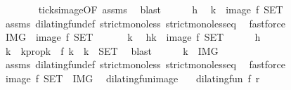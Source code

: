 \begin{isabellebody}
\ \ \ \ \ \ \isamarkupfalse%
\ ticks{\isacharunderscore}image{\isacharbrackleft}OF\ assms{\isacharbrackright}\ \isamarkupfalse%
\ blast\isanewline
\ \ \ \ \isamarkupfalse%
\ h\ \isamarkupfalse%
\ {\isacartoucheopen}k\ {\isasymin}\ image\ f\ {\isacharquery}SET{\isacartoucheclose}\isanewline
\ \ \ \ \ \ \isamarkupfalse%
\ assms\ dilating{\isacharunderscore}fun{\isacharunderscore}def\ strict{\isacharunderscore}mono{\isacharunderscore}less\ strict{\isacharunderscore}mono{\isacharunderscore}less{\isacharunderscore}eq\ \isamarkupfalse%
\ fastforce\isanewline
\ \ \isacommand{{\isacharbraceright}}\isamarkupfalse%
\ \isamarkupfalse%
\ {\isacartoucheopen}{\isacharquery}IMG\ {\isasymsubseteq}\ image\ f\ {\isacharquery}SET{\isacartoucheclose}\ \isacommand{{\isachardot}{\isachardot}}\isamarkupfalse%
\isanewline
{}\isamarkupfalse%
\isanewline
\ \ \isacommand{{\isacharbraceleft}}\isamarkupfalse%
\ \isamarkupfalse%
\ k\ \isamarkupfalse%
\ h{\isacharcolon}{\isacartoucheopen}k\ {\isasymin}\ image\ f\ {\isacharquery}SET{\isacartoucheclose}\isanewline
\ \ \ \ \isamarkupfalse%
\ h\ \isamarkupfalse%
\ k\ \ k{}prop{\isacharcolon}{\isacartoucheopen}k\ {\isacharequal}\ f\ k\ {\isasymand}\ k\ {\isasymin}\ {\isacharquery}SET{\isacartoucheclose}\ \isamarkupfalse%
\ blast\isanewline
\ \ \ \ \isamarkupfalse%
\ {\isacartoucheopen}k\ {\isasymin}\ {\isacharquery}IMG{\isacartoucheclose}\isanewline
\ \ \ \ \ \ \isamarkupfalse%
\ assms\ dilating{\isacharunderscore}fun{\isacharunderscore}def\ strict{\isacharunderscore}mono{\isacharunderscore}less\ strict{\isacharunderscore}mono{\isacharunderscore}less{\isacharunderscore}eq\ \isamarkupfalse%
\ fastforce\isanewline
\ \ \isacommand{{\isacharbraceright}}\isamarkupfalse%
\ \isamarkupfalse%
\ {\isacartoucheopen}image\ f\ {\isacharquery}SET\ {\isasymsubseteq}\ {\isacharquery}IMG{\isacartoucheclose}\ \isacommand{{\isachardot}{\isachardot}}\isamarkupfalse%
\isanewline
{}\isamarkupfalse%
%
\endisatagproof
{\isafoldproof}%
%
\isadelimproof
\isanewline
%
\endisadelimproof
\isanewline
{}\isamarkupfalse%
\ dilating{\isacharunderscore}fun{\isacharunderscore}image{\isacharcolon}\isanewline
\ \ \ {\isacartoucheopen}dilating{\isacharunderscore}fun\ f\ r{\isacartoucheclose}\isanewline

\end{isabellebody}
